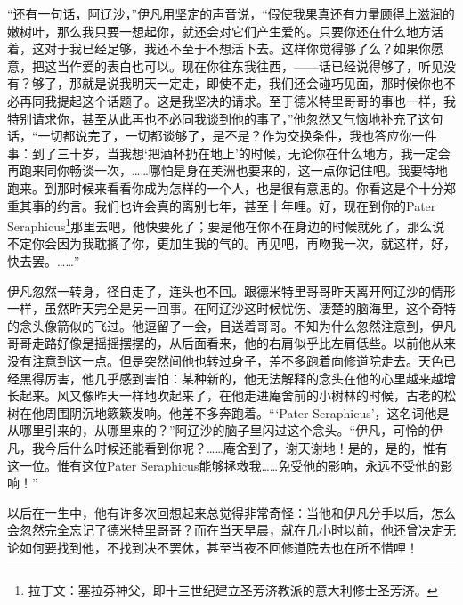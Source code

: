 \par “还有一句话，阿辽沙，”伊凡用坚定的声音说，“假使我果真还有力量顾得上滋润的嫩树叶，那么我只要一想起你，就还会对它们产生爱的。只要你还在什么地方活着，这对于我已经足够，我还不至于不想活下去。这样你觉得够了么？如果你愿意，把这当作爱的表白也可以。现在你往东我往西，——话已经说得够了，听见没有？够了，那就是说我明天一定走，即使不走，我们还会碰巧见面，那时候你也不必再同我提起这个话题了。这是我坚决的请求。至于德米特里哥哥的事也一样，我特别请求你，甚至从此再也不必同我谈到他的事了，”他忽然又气恼地补充了这句话，“一切都说完了，一切都谈够了，是不是？作为交换条件，我也答应你一件事：到了三十岁，当我想‘把酒杯扔在地上’的时候，无论你在什么地方，我一定会再跑来同你畅谈一次，……哪怕是身在美洲也要来的，这一点你记住吧。我要特地跑来。到那时候来看看你成为怎样的一个人，也是很有意思的。你看这是个十分郑重其事的约言。我们也许会真的离别七年，甚至十年哩。好，现在到你的Pater Seraphicus\footnote{拉丁文：塞拉芬神父，即十三世纪建立圣芳济教派的意大利修士圣芳济。}那里去吧，他快要死了；要是他在你不在身边的时候就死了，那么说不定你会因为我耽搁了你，更加生我的气的。再见吧，再吻我一次，就这样，好，快去罢。……”
\par 伊凡忽然一转身，径自走了，连头也不回。跟德米特里哥哥昨天离开阿辽沙的情形一样，虽然昨天完全是另一回事。在阿辽沙这时候忧伤、凄楚的脑海里，这个奇特的念头像箭似的飞过。他逗留了一会，目送着哥哥。不知为什么忽然注意到，伊凡哥哥走路好像是摇摇摆摆的，从后面看来，他的右肩似乎比左肩低些。以前他从来没有注意到这一点。但是突然间他也转过身子，差不多跑着向修道院走去。天色已经黑得厉害，他几乎感到害怕：某种新的，他无法解释的念头在他的心里越来越增长起来。风又像昨天一样地吹起来了，在他走进庵舍前的小树林的时候，古老的松树在他周围阴沉地簌簌发响。他差不多奔跑着。“‘Pater Seraphicus’，这名词他是从哪里引来的，从哪里来的？”阿辽沙的脑子里闪过这个念头。“伊凡，可怜的伊凡，我今后什么时候还能看到你呢？……庵舍到了，谢天谢地！是的，是的，惟有这一位。惟有这位Pater Seraphicus能够拯救我……免受他的影响，永远不受他的影响！”
\par 以后在一生中，他有许多次回想起来总觉得非常奇怪：当他和伊凡分手以后，怎么会忽然完全忘记了德米特里哥哥？而在当天早晨，就在几小时以前，他还曾决定无论如何要找到他，不找到决不罢休，甚至当夜不回修道院去也在所不惜哩！
